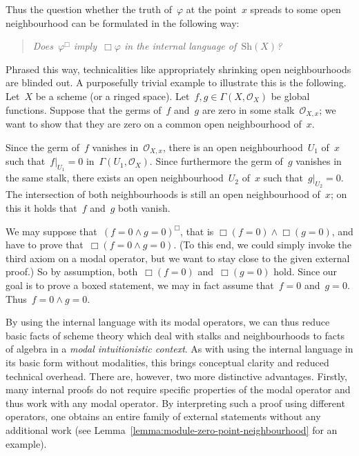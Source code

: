 \documentclass[10pt,reqno,a4paper]{amsbook}
\makeatletter
\theoremstyle{definition}
\theoremstyle{plain}
\theoremstyle{remark}
\renewcommand{\O}{\mathcal{O}}
\newcommand{\Sh}{\mathrm{Sh}}
\newcommand{\?}{\,{:}\,}
\renewcommand{\_}{\mathpunct{.}\,}
\renewenvironment{proof}[1][\proofname]{\par
  \pushQED{\qed}%
  \normalfont \topsep6\p@\@plus6\p@\relax
  \trivlist
  \item[\hskip\labelsep
        \itshape
    #1\@addpunct{.}]\ignorespaces
}{%
  \popQED\endtrivlist\@endpefalse
}
\makeatother
\begin{document}
Thus the question whether the truth of~$\varphi$ at the point~$x$ spreads to
some open neighbourhood can be formulated in the following way:
\begin{quote}
\emph{Does~$\varphi^\Box$ imply~$\Box\varphi$ in the internal language
of~$\Sh(X)$?}
\end{quote}
Phrased this way, technicalities like appropriately shrinking open
neighbourhoods are blinded out. A purposefully trivial example to illustrate
this is the following. Let~$X$ be a scheme (or a ringed space). Let~$f,g \in
\Gamma(X,\O_X)$ be global functions. Suppose that the germs of~$f$ and~$g$ are
zero in some stalk~$\O_{X,x}$; we want to show that they are zero on a common
open neighbourhood of~$x$.

\begin{proof}[Usual proof]Since the germ of~$f$ vanishes in~$\O_{X,x}$, there
is an open neighbourhood~$U_1$ of~$x$ such that~$f|_{U_1} = 0$
in~$\Gamma(U_1,\O_X)$. Since furthermore the germ of~$g$ vanishes in the same stalk,
there exists an open neighbourhood~$U_2$ of~$x$ such that~$g|_{U_2} = 0$. The
intersection of both neighbourhoods is still an open neighbourhood of~$x$; on
this it holds that~$f$ and~$g$ both vanish.
\end{proof}

\begin{proof}[Proof in the internal language]We may suppose that~$(f = 0 \wedge
g = 0)^\Box$, that is $\Box(f=0) \wedge \Box(g=0)$, and have to prove
that~$\Box(f=0 \wedge g=0)$. (To this end, we could simply invoke the third
axiom on a modal operator, but we want to stay close to the given external
proof.) So by assumption, both~$\Box(f=0)$ and~$\Box(g=0)$ hold. Since our goal
is to prove a boxed statement, we may in fact assume that~$f = 0$ and~$g = 0$.
Thus~$f = 0 \wedge g = 0$.\end{proof}

By using the internal language with its modal operators, we can thus reduce
basic facts of scheme theory which deal with stalks and neighbourhoods to facts
of algebra in a \emph{modal intuitionistic context}. As with using the internal
language in its basic form without modalities, this brings conceptual clarity
and reduced technical overhead. There are, however, two more distinctive
advantages. Firstly, many internal proofs do not require specific properties of
the modal operator and thus work with any modal operator. By interpreting such
a proof using different operators, one obtains an entire family of external
statements without any additional work (see
Lemma~\ref{lemma:module-zero-point-neighbourhood} for an example).
\end{document}

